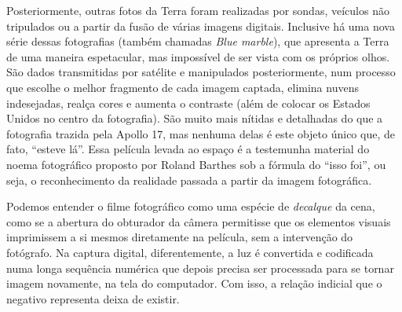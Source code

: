 Posteriormente, outras fotos da Terra foram realizadas por sondas,
veículos não tripulados ou a partir da fusão de várias imagens digitais.
Inclusive há uma nova série dessas fotografias (também chamadas
\emph{Blue marble}), que apresenta a Terra de uma maneira espetacular,
mas impossível de ser vista com os próprios olhos. São dados
transmitidas por satélite e manipulados posteriormente, num processo que
escolhe o melhor fragmento de cada imagem captada, elimina nuvens
indesejadas, realça cores e aumenta o contraste (além de colocar os
Estados Unidos no centro da fotografia). São muito mais nítidas e
detalhadas do que a fotografia trazida pela Apollo 17, mas nenhuma delas
é este objeto único que, de fato, ``esteve lá''. Essa película levada ao espaço é a testemunha material do noema fotográfico proposto por Roland Barthes sob a fórmula do ``isso foi'', ou seja, o reconhecimento da realidade passada a partir da imagem fotográfica.

Podemos entender o filme fotográfico como uma espécie de \emph{decalque}
da cena, como se a abertura do obturador da câmera permitisse que os
elementos visuais imprimissem a si mesmos diretamente na película, sem a
intervenção do fotógrafo. Na captura digital, diferentemente, a luz é
convertida e codificada numa longa sequência numérica que depois precisa
ser processada para se tornar imagem novamente, na tela do computador.
Com isso, a relação indicial que o negativo representa deixa de existir.

